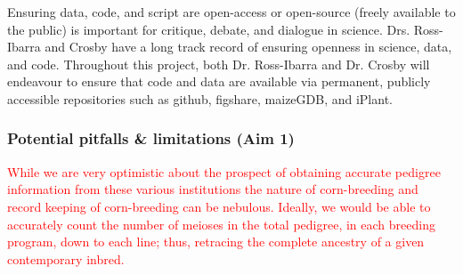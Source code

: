 \documentclass[12pt]{article}
\begin{document}
Ensuring data, code, and script are open-access or open-source (freely available to the public) is important for critique, debate, and dialogue in science. 
Drs. Ross-Ibarra and Crosby have a long track record of ensuring openness in science, data, and code. Throughout this project, both Dr. Ross-Ibarra and Dr. Crosby will endeavour to ensure that code and data are available via permanent, publicly accessible repositories such as github, figshare, maizeGDB, and iPlant.

\subsubsection*{Potential pitfalls \& limitations (Aim 1)}
\textcolor{red}{While we are very optimistic about the prospect of obtaining accurate pedigree information from these various institutions the nature of corn-breeding and record keeping of corn-breeding can be nebulous. 
Ideally, we would be able to accurately count the number of meioses in the total pedigree, in each breeding program, down to each line; thus, retracing the complete ancestry of a given contemporary inbred. }




\end{document}
